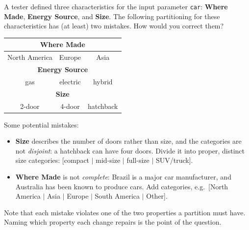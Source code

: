 \documentclass[addpoints, answers]{exam}
\begin{document}
\begin{questions}
\newpage


\question[4] A tester defined three characteristics for the input
  parameter \texttt{car}: \textbf{Where Made}, \textbf{Energy Source},
  and \textbf{Size}. The following partitioning for these
  characteristics has (at least) two mistakes. How would you correct
  them?

  \begin{center}
  \begin{tabular}{|c|c|c|}
    \hline
    \multicolumn{3}{|c|}{\textbf{Where Made}} \\\hline
    North America & Europe & Asia \\\hline
    \multicolumn{3}{|c|}{\textbf{Energy Source}} \\\hline
    gas & electric & hybrid \\\hline
    \multicolumn{3}{|c|}{\textbf{Size}}\\\hline
    2-door & 4-door & hatchback\\\hline
  \end{tabular}
\end{center}
\begin{solution}
  Some potential mistakes:
  \begin{itemize}
  \item \textbf{Size} describes the number of doors rather than size,
    and the categories are not \emph{disjoint}: a hatchback can have
    four doors. Divide it into proper, distinct size categories:
    [compact $|$ mid-size $|$ full-size $|$ SUV/truck].
  \item \textbf{Where Made} is not \emph{complete}: Brazil is a major
    car manufacturer, and Australia has been known to produce cars.
    Add categories, e.g.\ [North America $|$ Asia $|$ Europe $|$
    South America $|$ Other].
  \end{itemize}
  Note that each mistake violates one of the two properties a
  partition must have. Naming which property each change repairs is
  the point of the question.
\end{solution}

\newpage



\end{questions}
\end{document}
